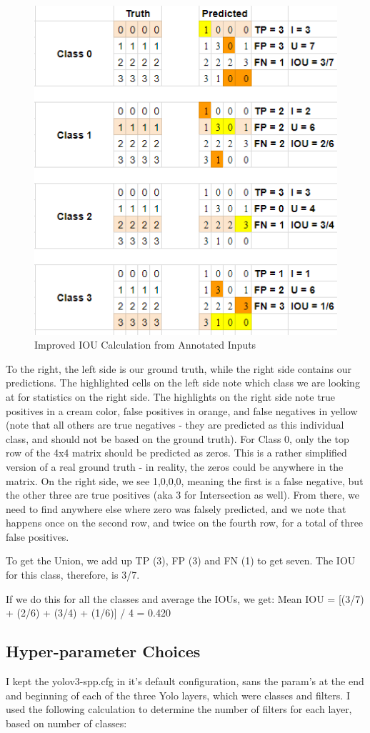 \documentclass[oneside]{article}
\begin{document}
\newpage
\begin{figure}
\centering
\includegraphics[width=0.7\linewidth]{images/confusion-f1}
\caption{Improved IOU Calculation from Annotated Inputs}
\label{fig:confusion-f1}
\end{figure}
To the right, the left side is our ground
truth, while the right side contains our predictions. The highlighted cells on the
left side note which class we are looking
at for statistics on the right side. The
highlights on the right side note true
positives in a cream color, false positives
in orange, and false negatives in yellow
(note that all others are true negatives -
they are predicted as this individual class,
and should not be based on the ground truth).
For Class 0, only the top row of the 4x4 matrix should be predicted as zeros. This is a rather simplified version of a real ground truth - in reality, the zeros could be anywhere in the matrix. On the right side, we see 1,0,0,0, meaning the first is a false negative, but the other three are true positives (aka 3 for Intersection as well). From there, we need to find anywhere else where zero was falsely predicted, and we note that happens once on the second row, and twice on the fourth row, for a total of three false positives.

 To get the Union, we add up TP (3), FP (3) and FN (1) to get seven. The IOU for this class,  
 therefore, is 3/7.

 If we do this for all the classes and average the IOUs, we get:
       Mean IOU = [(3/7) + (2/6) + (3/4) + (1/6)] / 4 = 0.420

\subsection{Hyper-parameter Choices}
I kept the yolov3-spp.cfg in it’s default configuration, sans the param’s at the end and beginning of each of the three Yolo layers, which were classes and filters. I used the following calculation to determine the number of filters for each layer, based on number of classes:
\end{document}
